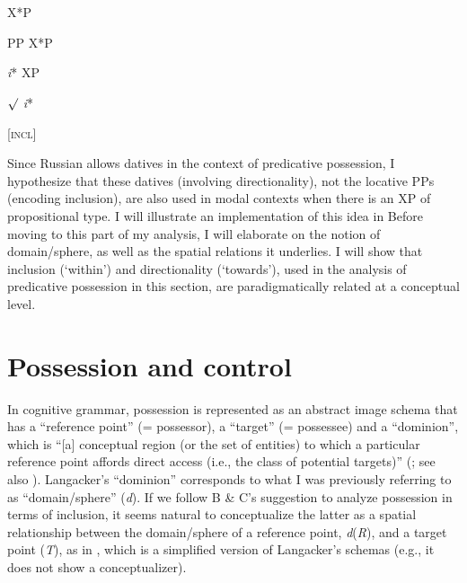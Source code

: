 \documentclass[output=paper,colorlinks,citecolor=brown]{./langscibook}
\begin{document}
\ea%
    \label{ex:tsedryk:27}
    \gll\\
        \\
    \glt
    \z

          X*P

  PP  X*P

  \textit{i}*  XP

   ${\surd}$   \textit{i}*

  [\textsc{incl}]

Since Russian allows datives in the context of predicative possession, I hypothesize that these datives (involving directionality), not the locative PPs (encoding inclusion), are also used in modal contexts when there is an XP of propositional type. I will illustrate an implementation of this idea in  Before moving to this part of my analysis, I will elaborate on the notion of domain/sphere, as well as the spatial relations it underlies. I will show that inclusion (‘within’) and directionality (‘towards’), used in the analysis of predicative possession in this section, are paradigmatically related at a conceptual level. 

\section{Possession and control}\label{sec:tsedryk:3}

In cognitive grammar, possession is represented as an abstract image schema that has a “reference point” (= possessor), a “target” (= possessee) and a “dominion”, which is “[a] conceptual region (or the set of entities) to which a particular reference point affords direct access (i.e., the class of potential targets)” (\citealt[6]{Langacker1993}; see also \citealt[82]{Langacker2009}). Langacker’s “dominion” corresponds to what I was previously referring to as “domain/sphere” (\textit{d}). If we follow B \& C’s suggestion to analyze possession in terms of inclusion, it seems natural to conceptualize the latter as a spatial relationship between the domain/sphere of a reference point, \textit{d}(\textit{R}), and a target point (\textit{T}), as in , which is a simplified version of Langacker’s schemas (e.g., it does not show a conceptualizer).


\end{document}
